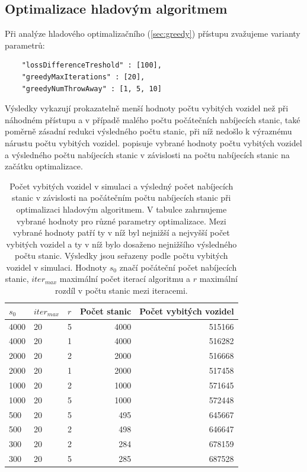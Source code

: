 \subsection{Optimalizace hladovým algoritmem}

Při analýze hladového optimalizačního (\cref{sec:greedy}) přístupu zvažujeme
varianty parametrů:
\begin{verbatim}
    "lossDifferenceTreshold" : [100],
    "greedyMaxIterations" : [20],
    "greedyNumThrowAway" : [1, 5, 10]
\end{verbatim}

Výsledky vykazují prokazatelně menší hodnoty počtu vybitých vozidel než při
náhodném přístupu a v případě malého počtu počátečních nabíjecích stanic,
také poměrně zásadní redukci výsledného počtu stanic, při níž nedošlo k výraznému
nárustu počtu vybitých vozidel.  popisuje 
vybrané hodnoty počtu vybitých vozidel a výsledného počtu nabíjecích stanic v 
závislosti na počtu nabíjecích stanic na začátku optimalizace.

\begin{table}
\centering\footnotesize\sf
\begin{tabular}{lllrr}
\toprule
$s_0$ & $iter_{max}$ & $r$ & Počet stanic & Počet vybitých vozidel\\
\midrule
4000 & 20 & 5 & 4000 & 515166 \\
4000 & 20 & 1 & 4000 & 516282 \\
2000 & 20 & 2 & 2000 & 516668 \\
2000 & 20 & 1 & 2000 & 517458 \\
1000 & 20 & 2 & 1000 & 571645 \\
1000 & 20 & 5 & 1000 & 572448 \\
500 & 20 & 5 & 495 & 645667 \\
500 & 20 & 2 & 498 & 646647 \\
300 & 20 & 2 & 284 & 678159 \\
300 & 20 & 5 & 285 & 687528 \\
\bottomrule
\end{tabular}
\caption{Počet vybitých vozidel v simulaci a výsledný počet nabíjecích stanic v závislosti na 
počátečním počtu nabíjecích stanic při optimalizaci hladovým algoritmem. V tabulce zahrnujeme
vybrané hodnoty pro různé parametry optimalizace. Mezi vybrané hodnoty patří ty v níž byl
nejnižší a nejvyšší počet vybitých vozidel a ty v níž bylo dosaženo nejnižšího výsledného počtu stanic.
Výsledky jsou seřazeny podle počtu vybitých vozidel v simulaci. Hodnoty $s_0$ značí
počáteční počet nabíjecích stanic, $iter_{max}$ maximální počet iterací algoritmu a 
$r$ maximální rozdíl v počtu stanic mezi iteracemi.}
\label{tab:vysledky_greedy}
\end{table}


